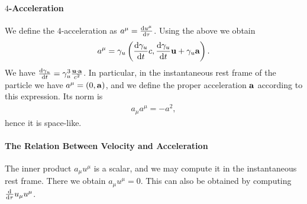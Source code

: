 
\paragraph{$4$-Acceleration}
We define the $4$-acceleration as $a^{\mu} = \dv{u^{\mu}}{\tau}$. Using the above we obtain
\begin{align*}
	a^{\mu} = \gamma_{u}\left(\dv{\gamma_{u}}{t}c, \dv{\gamma_{u}}{t}\vb{u} + \gamma_{u}\vb{a}\right).
\end{align*}
We have $\dv{\gamma_{u}}{t} = \gamma_{u}^{3}\frac{\vb{u}\cdot\vb{a}}{c^{2}}$. In particular, in the instantaneous rest frame of the particle we have $a^{\mu} = (0, \vb{a})$, and we define the proper acceleration $\vb{a}$ according to this expression. Its norm is
\begin{align*}
	a_{\mu}a^{\mu} = -a^{2},
\end{align*}
hence it is space-like.

\paragraph{The Relation Between Velocity and Acceleration}
The inner product $a_{\mu}u^{\mu}$ is a scalar, and we may compute it in the instantaneous rest frame. There we obtain $a_{\mu}u^{\mu} = 0$. This can also be obtained by computing $\dv{\tau}u_{\mu}u^{\mu}$.